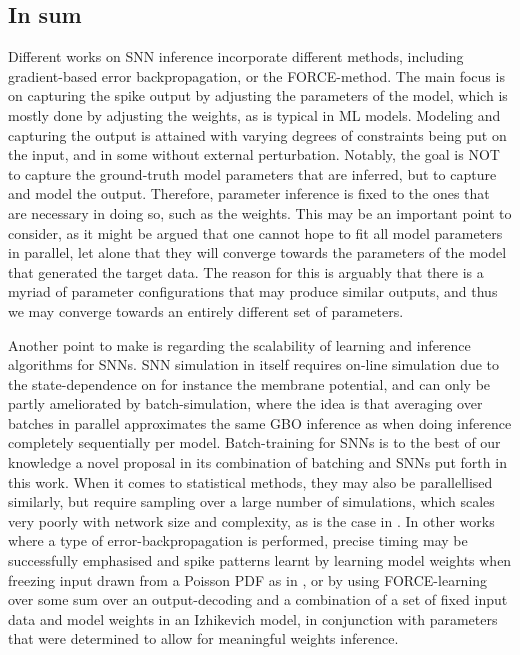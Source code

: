 \documentclass[mphil,deptreport,ianc]{infthesis} %
\begin{document}
\subsection{In sum}

Different works on SNN inference incorporate different methods, including gradient-based error backpropagation, or the FORCE-method. 
The main focus is on capturing the spike output by adjusting the parameters of the model, which is mostly done by adjusting the weights, as is typical in ML models.
Modeling and capturing the output is attained with varying degrees of constraints being put on the input, and in some without external perturbation.
Notably, the goal is NOT to capture the ground-truth model parameters that are inferred, but to capture and model the output. Therefore, parameter inference is fixed to the ones that are necessary in doing so, such as the weights.
This may be an important point to consider, as it might be argued that one cannot hope to fit all model parameters in parallel, let alone that they will converge towards the parameters of the model that generated the target data. The reason for this is arguably that there is a myriad of parameter configurations that may produce similar outputs, and thus we may converge towards an entirely different set of parameters.

Another point to make is regarding the scalability of learning and inference algorithms for SNNs.
SNN simulation in itself requires on-line simulation due to the state-dependence on for instance the membrane potential, and can only be partly ameliorated by batch-simulation, where the idea is that averaging over batches in parallel approximates the same GBO inference as when doing inference completely sequentially per model.
Batch-training for SNNs is to the best of our knowledge a novel proposal in its combination of batching and SNNs put forth in this work.
When it comes to statistical methods, they may also be parallellised similarly, but require sampling over a large number of simulations, which scales very poorly with network size and complexity, as is the case in \cite{Stringer2016InhibitoryNetworks}.
In other works where a type of error-backpropagation is performed, precise timing may be successfully emphasised and spike patterns learnt by learning model weights when freezing input drawn from a Poisson PDF as in \cite{Zenke2018}, or by using FORCE-learning over some sum over an output-decoding and a combination of a set of fixed input data and model weights in an Izhikevich model, in conjunction with parameters that were determined to allow for meaningful weights inference.
\end{document}
